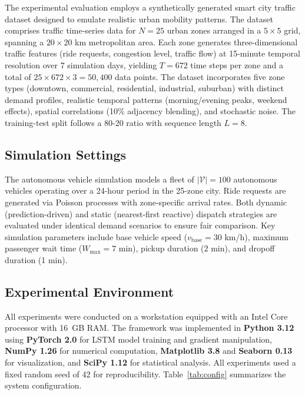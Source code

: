 \documentclass[journal]{IEEEtran}
\begin{document}
The experimental evaluation employs a synthetically generated smart city traffic dataset designed to emulate realistic urban mobility patterns. The dataset comprises traffic time-series data for $N = 25$ urban zones arranged in a $5 \times 5$ grid, spanning a $20 \times 20$ km metropolitan area. Each zone generates three-dimensional traffic features (ride requests, congestion level, traffic flow) at 15-minute temporal resolution over 7 simulation days, yielding $T = 672$ time steps per zone and a total of $25 \times 672 \times 3 = 50{,}400$ data points. The dataset incorporates five zone types (downtown, commercial, residential, industrial, suburban) with distinct demand profiles, realistic temporal patterns (morning/evening peaks, weekend effects), spatial correlations (10\% adjacency blending), and stochastic noise. The training-test split follows a 80-20 ratio with sequence length $L = 8$.

\subsection{Simulation Settings}

The autonomous vehicle simulation models a fleet of $|\mathcal{V}| = 100$ autonomous vehicles operating over a 24-hour period in the 25-zone city. Ride requests are generated via Poisson processes with zone-specific arrival rates. Both dynamic (prediction-driven) and static (nearest-first reactive) dispatch strategies are evaluated under identical demand scenarios to ensure fair comparison. Key simulation parameters include base vehicle speed ($v_{\text{base}} = 30$ km/h), maximum passenger wait time ($W_{\max} = 7$ min), pickup duration (2 min), and dropoff duration (1 min).

\subsection{Experimental Environment}

All experiments were conducted on a workstation equipped with an Intel Core processor with 16~GB RAM. The framework was implemented in \textbf{Python 3.12} using \textbf{PyTorch 2.0} for LSTM model training and gradient manipulation, \textbf{NumPy 1.26} for numerical computation, \textbf{Matplotlib 3.8} and \textbf{Seaborn 0.13} for visualization, and \textbf{SciPy 1.12} for statistical analysis. All experiments used a fixed random seed of 42 for reproducibility. Table~\ref{tab:config} summarizes the system configuration.
\end{document}
